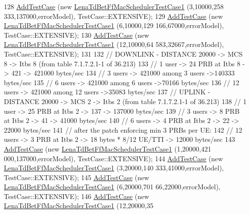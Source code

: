 \begin{DoxyCode}
128   \hyperlink{classns3_1_1TestCase_a3718088e3eefd5d6454569d2e0ddd835}{AddTestCase} (\textcolor{keyword}{new} \hyperlink{classLenaTdBetFfMacSchedulerTestCase1}{LenaTdBetFfMacSchedulerTestCase1} (3,10000,258
      333,137000,errorModel), TestCase::EXTENSIVE);
129   \hyperlink{classns3_1_1TestCase_a3718088e3eefd5d6454569d2e0ddd835}{AddTestCase} (\textcolor{keyword}{new} \hyperlink{classLenaTdBetFfMacSchedulerTestCase1}{LenaTdBetFfMacSchedulerTestCase1} (6,10000,129
      166,67000,errorModel), TestCase::EXTENSIVE);
130   \hyperlink{classns3_1_1TestCase_a3718088e3eefd5d6454569d2e0ddd835}{AddTestCase} (\textcolor{keyword}{new} \hyperlink{classLenaTdBetFfMacSchedulerTestCase1}{LenaTdBetFfMacSchedulerTestCase1} (12,10000,64
      583,32667,errorModel), TestCase::EXTENSIVE);
131 
132   \textcolor{comment}{// DOWNLINK - DISTANCE 20000 -> MCS 8 -> Itbs 8 (from table 7.1.7.2.1-1 of 36.213)}
133   \textcolor{comment}{// 1 user -> 24 PRB at Itbs 8 -> 421 -> 421000 bytes/sec}
134   \textcolor{comment}{// 3 users -> 421000 among 3 users ->140333  bytes/sec}
135   \textcolor{comment}{// 6 users -> 421000 among 6 users ->70166  bytes/sec}
136   \textcolor{comment}{// 12 users -> 421000 among 12 users ->35083  bytes/sec }
137   \textcolor{comment}{// UPLINK - DISTANCE 20000 -> MCS 2 -> Itbs 2 (from table 7.1.7.2.1-1 of 36.213)}
138   \textcolor{comment}{// 1 user -> 25 PRB at Itbs 2 -> 137 -> 137000 bytes/sec}
139   \textcolor{comment}{// 3 users -> 8 PRB at Itbs 2 -> 41 -> 41000 bytes/sec}
140   \textcolor{comment}{// 6 users -> 4 PRB at Itbs 2 -> 22 -> 22000 bytes/sec}
141   \textcolor{comment}{// after the patch enforcing min 3 PRBs per UE:}
142   \textcolor{comment}{// 12 users -> 3 PRB at Itbs 2 -> 18 bytes * 8/12 UE/TTI -> 12000 bytes/sec}
143   \hyperlink{classns3_1_1TestCase_a3718088e3eefd5d6454569d2e0ddd835}{AddTestCase} (\textcolor{keyword}{new} \hyperlink{classLenaTdBetFfMacSchedulerTestCase1}{LenaTdBetFfMacSchedulerTestCase1} (1,20000,421
      000,137000,errorModel), TestCase::EXTENSIVE);
144   \hyperlink{classns3_1_1TestCase_a3718088e3eefd5d6454569d2e0ddd835}{AddTestCase} (\textcolor{keyword}{new} \hyperlink{classLenaTdBetFfMacSchedulerTestCase1}{LenaTdBetFfMacSchedulerTestCase1} (3,20000,140
      333,41000,errorModel), TestCase::EXTENSIVE);
145   \hyperlink{classns3_1_1TestCase_a3718088e3eefd5d6454569d2e0ddd835}{AddTestCase} (\textcolor{keyword}{new} \hyperlink{classLenaTdBetFfMacSchedulerTestCase1}{LenaTdBetFfMacSchedulerTestCase1} (6,20000,701
      66,22000,errorModel), TestCase::EXTENSIVE);
146   \hyperlink{classns3_1_1TestCase_a3718088e3eefd5d6454569d2e0ddd835}{AddTestCase} (\textcolor{keyword}{new} \hyperlink{classLenaTdBetFfMacSchedulerTestCase1}{LenaTdBetFfMacSchedulerTestCase1} (12,20000,35

\end{DoxyCode}
